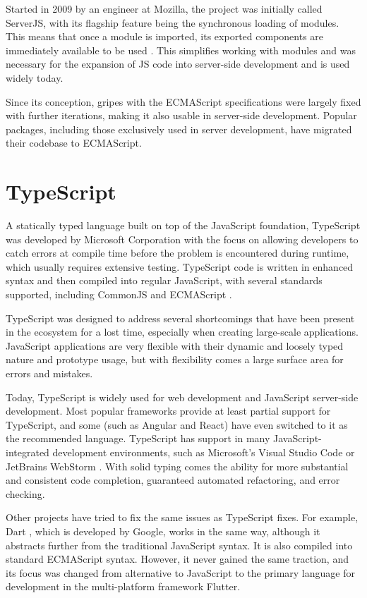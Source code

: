 Started in 2009 by an engineer at Mozilla, the project was initially called
ServerJS, with its flagship feature being the synchronous loading of modules.
This means that once a module is imported, its exported components are
immediately available to be used \cite{commonjs-introduction}. This simplifies
working with modules and was necessary for the expansion of JS code into
server-side development and is used widely today. 

Since its conception, gripes with the ECMAScript specifications were largely
fixed with further iterations, making it also usable in server-side development.
Popular packages, including those exclusively used in server development, have
migrated their codebase to ECMAScript.


\section*{TypeScript}
A statically typed language built on top of the JavaScript foundation,
TypeScript was developed by Microsoft Corporation with the focus on allowing
developers to catch errors at compile time before the problem is encountered
during runtime, which usually requires extensive testing. TypeScript code is
written in enhanced syntax and then compiled into regular JavaScript, with
several standards supported, including CommonJS and ECMAScript
\cite{typescript-modules}.

TypeScript was designed to address several shortcomings that have been present
in the ecosystem for a lost time, especially when creating large-scale
applications. JavaScript applications are very flexible with their dynamic and
loosely typed nature and prototype usage, but with flexibility comes a large
surface area for errors and mistakes. 

Today, TypeScript is widely used for web development and JavaScript server-side
development. Most popular frameworks provide at least partial support for
TypeScript, and some (such as Angular and React) have even switched to it as the
recommended language. TypeScript has support in many JavaScript-integrated
development environments, such as Microsoft's Visual Studio Code
\cite{typescript-vscode} or JetBrains WebStorm \cite{typescript-webstorm}. With
solid typing comes the ability for more substantial and consistent code
completion, guaranteed automated refactoring, and error checking.

Other projects have tried to fix the same issues as TypeScript fixes. For
example, Dart \cite{dart-homepage}, which is developed by Google, works in the
same way, although it abstracts further from the traditional JavaScript syntax.
It is also compiled into standard ECMAScript syntax. However, it never gained
the same traction, and its focus was changed from alternative to JavaScript to
the primary language for development in the multi-platform framework Flutter.


